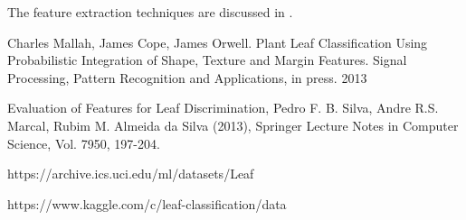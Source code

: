 \documentclass{article}
\begin{document}
The feature extraction techniques are discussed in \cite{Pedro13}.

\begin{thebibliography}{9}
Charles Mallah, James Cope, James Orwell. Plant Leaf Classification Using Probabilistic Integration of Shape, Texture and Margin Features. Signal Processing, Pattern Recognition and Applications, in press. 2013

Evaluation of Features for Leaf Discrimination, Pedro F. B. Silva, Andre R.S. Marcal, Rubim M. Almeida da Silva (2013), Springer Lecture Notes in Computer Science, Vol. 7950, 197-204.

https://archive.ics.uci.edu/ml/datasets/Leaf

https://www.kaggle.com/c/leaf-classification/data

\end{thebibliography}
\end{document}
